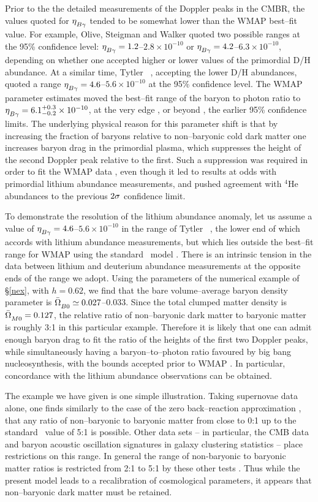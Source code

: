 \documentclass[12pt]{article}
\begin{document}
Prior to the
the detailed measurements of the Doppler peaks in the CMBR, the values
quoted for $\etBg$ tended to be somewhat lower than the WMAP best--fit value.
For example, Olive, Steigman and Walker \cite{bbn1} quoted two possible
ranges at the 95\% confidence level: $\etBg=1.2$--$2.8\times10^{-10}$ or
$\etBg=4.2$--$6.3\times10^{-10}$, depending on whether one accepted higher
or lower values of the primordial D/H abundance. At a similar time, Tytler
\etal\ \cite{bbn2}, accepting the lower D/H abundances, quoted a range
$\etBg=4.6$--$5.6\times10^{-10}$ at the 95\% confidence level.
The WMAP parameter estimates moved the best--fit
range of the baryon to photon ratio to $\etBg=6.1^{+0.3}_{-0.2}\times10^{-10}
$, at the very edge \cite{bbn1}, or beyond \cite{bbn2}, the earlier
95\% confidence limits. The underlying physical reason for this parameter
shift is that by increasing the fraction of baryons relative to
non--baryonic cold dark matter one increases baryon drag in the
primordial plasma, which
suppresses the height of the second Doppler peak relative to the first.
Such a suppression was required in order to fit the WMAP data
\cite{wmap}, even though it led to results at odds with primordial
lithium abundance measurements, and pushed agreement with $^4$He abundances
to the previous $2\sigma$ confidence limit.

To demonstrate the resolution of the lithium abundance anomaly, let us
assume a value of $\etBg=4.6$--$5.6\times10^{-10}$ in the range of
Tytler \etal\ \cite{bbn2}, the lower end of which accords with lithium
abundance measurements, but which lies outside the best--fit range for WMAP
using the standard \LCDM\ model \cite{bbn3}. There is an intrinsic tension
in the data between lithium and deuterium abundance measurements \cite{bbn4}
at the opposite ends of the range we adopt. Using the parameters of the
numerical example of \S\ref{nex}, with $h=0.62$, we find that the
bare volume--average baryon density parameter is
$\bOmBn\simeq0.027$--$0.033$.
Since the total clumped matter density is $\OMMn=0.127$,
the relative ratio of non--baryonic dark matter to baryonic
matter is roughly 3:1 in this particular example. Therefore it
is likely that one can admit enough baryon drag to fit the ratio of
the heights of the first two Doppler peaks, while simultaneously
having a baryon--to--photon ratio favoured by big bang nucleosynthesis,
with the bounds accepted prior to WMAP \cite{bbn1,bbn2}. In particular,
concordance with the lithium abundance observations can be obtained.

The example we have given is one simple illustration. Taking supernovae
data alone, one finds similarly to the case of the zero back--reaction
approximation \cite{paper1}, that any ratio of non--baryonic to baryonic
matter from close to 0:1 up to the standard \LCDM\ value of 5:1 is possible.
Other data sets -- in particular, the CMB data and baryon acoustic
oscillation signatures in galaxy clustering statistics -- place restrictions
on this range. In general the range of non-baryonic to baryonic matter
ratios is restricted from 2:1 to 5:1 by these other tests \cite{paper2}. Thus
while the present model leads to a recalibration of cosmological parameters,
it appears that non--baryonic dark matter must be retained.
\end{document}
